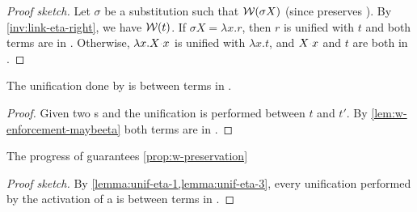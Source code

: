 \begin{proof}[Proof sketch]
  Let $\sigma$ be a substitution such that $\mathcal{W}(\sigma X)$ (since \Ue preserves \wellb).
  By \cref{inv:link-eta-right}, we have $\mathcal{W}(t)$.
  If $\sigma X = \lambda x.r$, then $r$ is unified with $t$ and both terms are in \wellb.
  Otherwise, $\lambda x. X\appsep x$ is unified with $\lambda x. t$, and $X\appsep x$ and $t$
  are both in \wellb.
\end{proof}



\begin{lemma} \label{lemma:unif-eta-3}
  The unification done by \progressetadedup is between
  terms in \wellb.
\end{lemma}

\begin{proof}
  Given two \linketa{}s  and
  the unification is performed between $t$ and $t'$.
  By \cref{lem:w-enforcement-maybeeta} both terms are in
  \wellb.
\end{proof}

\begin{lemma} \label{lemma:unif-wellb}
  The progress of \linketa guarantees \cref{prop:w-preservation}
\end{lemma}

\begin{proof}[Proof sketch]
  By \cref{lemma:unif-eta-1,lemma:unif-eta-3}, every
  unification performed by the activation of a \linketa is between
  terms in \wellb.
\end{proof}


